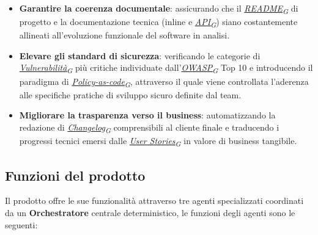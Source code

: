 \documentclass[12pt, a4paper]{article}
\newcommand{\urlglossario}{https://skynetunigroup.github.io/Code_Guardian/Documentazione/PB/glossario_v2.0.0.pdf} %
\newcommand{\glo}[2]{\href{\urlglossario\#nameddest=#2}{#1\textsubscript{G}}}
\begin{document}
\begin{itemize}
\item
  \textbf{Garantire la coerenza documentale}: assicurando che il \textit{\glo{README}{readme}}
  di progetto e la documentazione tecnica (inline e \textit{\glo{API}{api}}) siano costantemente allineati all'evoluzione funzionale del software in analisi.
\item
  \textbf{Elevare gli standard di sicurezza}: verificando le categorie di \textit{\glo{Vulnerabilità}{vulnerabilita}} più critiche individuate dall’\textit{\glo{OWASP}{owasp}} Top 10 e introducendo il paradigma di \textit{\glo{Policy-as-code}{policy-as-code}}, attraverso il quale viene controllata l’aderenza alle specifiche pratiche di sviluppo sicuro definite dal team.
\item
  \textbf{Migliorare la trasparenza verso il business}: automatizzando
  la redazione di \textit{\glo{Changelog}{changelog}} comprensibili al cliente finale e traducendo i progressi tecnici emersi dalle \textit{\glo{User Stories}{user-story}} in valore di business tangibile.
\end{itemize}

\subsection{Funzioni del prodotto}

Il prodotto offre le sue funzionalità attraverso tre agenti
specializzati coordinati da un \textbf{Orchestratore} centrale deterministico, le funzioni degli agenti sono le seguenti:
\end{document}
